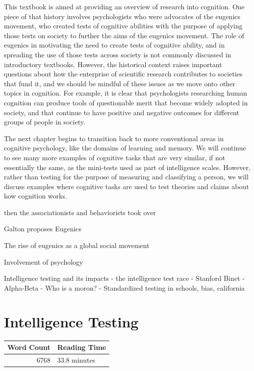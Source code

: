 \documentclass[
  oneside,
  12pt]{crumpbook}
\begin{document}
This textbook is aimed at providing an overview of research into cognition. One piece of that history involves psychologists who were advocates of the eugenics movement, who created tests of cognitive abilities with the purpose of applying those tests on society to further the aims of the eugenics movement. The role of eugenics in motivating the need to create tests of cognitive ability, and in spreading the use of those tests across society is not commonly discussed in introductory textbooks. However, the historical context raises important questions about how the enterprise of scientific research contributes to societies that fund it, and we should be mindful of these issues as we move onto other topics in cognition. For example, it is clear that psychologists researching human cognition can produce tools of questionable merit that become widely adopted in society, and that continue to have positive and negative outcomes for different groups of people in society.

The next chapter begins to transition back to more conventional areas in cognitive psychology, like the domains of learning and memory. We will continue to see many more examples of cognitive tasks that are very similar, if not essentially the same, as the mini-tests used as part of intelligence scales. However, rather than testing for the purpose of measuring and classifying a person, we will discuss examples where cognitive tasks are used to test theories and claims about how cognition works.

then the associationists and behaviorists took over

Galton proposes Eugenics

The rise of eugenics as a global social movement

Involvement of psychology

Intelligence testing and its impacts
- the intelligence test race
- Stanford Binet
- Alpha-Beta
- Who is a moron?
- Standardized testing in schools, bias, california

\hypertarget{intelligence-testing}{%
\chapter{Intelligence Testing}\label{intelligence-testing}}

\begin{tabular}{r|l}
\hline
Word Count & Reading Time\\
\hline
6768 & 33.8 minutes\\
\hline
\end{tabular}
\end{document}
